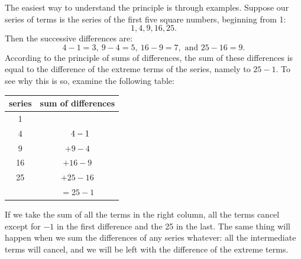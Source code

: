 \documentclass[polutonikogreek,english,twoside,openright]{article}
\begin{document}
The easiest way to understand the principle is through examples.  Suppose our series of terms is the series of the first five square numbers, beginning from 1:
$$1, 4, 9, 16, 25.$$
Then the successive differences are:
$$4-1= 3,\ 9-4 =5,\ 16-9=7, \mbox{ and } 25-16 = 9.$$
According to the principle of sums of differences, the sum of these differences is equal to the difference of the extreme terms of the series, namely to $25-1$.  To see why this is so, examine the following table:
\begin{center}
\begin{tabular}{c|c}
  series & sum of differences \\ \hline
  1 &  \\
  4 & $ \hspace*{.7em}4-1$ \\
  9 & $ +9-4$ \\
  16 & $+ 16-9 $ \\
  25 & $ + 25-16$ \\ \hline
       & $ = 25-1$
\end{tabular}
\end{center}
If we take the sum of all the terms in the right column, all the terms cancel except for $-1$ in the first difference and the 25 in the last.  The same thing will happen when we sum the differences of any series whatever: all the intermediate terms will cancel, and we will be left with the difference of the extreme terms.
\end{document}

